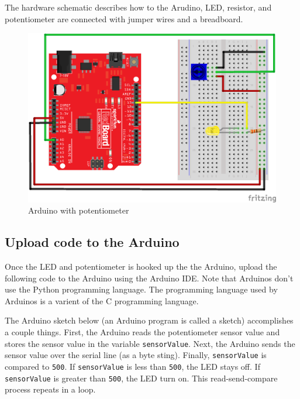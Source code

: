 \documentclass{book}
\makeatletter
\def\maxwidth{\ifdim\Gin@nat@width>\linewidth\linewidth
    \else\Gin@nat@width\fi}
\let\Oldincludegraphics\includegraphics
\renewcommand{\includegraphics}[1]{\Oldincludegraphics[width=.8\maxwidth]{#1}}
\makeatother
\begin{document}
The hardware schematic describes how to the Arudino, LED, resistor, and
potentiometer are connected with jumper wires and a breadboard.
    




    
        \begin{figure}
\centering
\includegraphics{images/redboard_pot_led_fritzing.png}
\caption{Arduino with potentiometer}
\end{figure}
    




    
        \subsection{Upload code to the
Arduino}\label{upload-code-to-the-arduino}
    




    
        Once the LED and potentiometer is hooked up the the Arduino, upload the
following code to the Arduino using the Arduino IDE. Note that Arduinos
don't use the Python programming language. The programming language used
by Arduinos is a varient of the C programming language.

The Arduino sketch below (an Arduino program is called a sketch)
accomplishes a couple things. First, the Arduino reads the potentiometer
sensor value and stores the sensor value in the variable
\lstinline!sensorValue!. Next, the Arduino sends the sensor value over
the serial line (as a byte sting). Finally, \lstinline!sensorValue! is
compared to \lstinline!500!. If \lstinline!sensorValue! is less than
\lstinline!500!, the LED stays off. If \lstinline!sensorValue! is
greater than \lstinline!500!, the LED turn on. This read-send-compare
process repeats in a loop.
    
\end{document}
